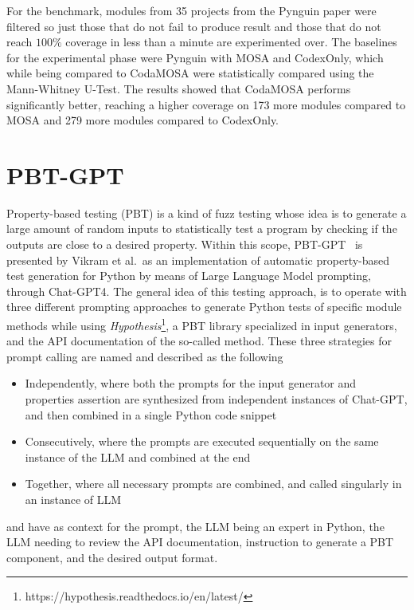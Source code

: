 \documentclass[%
  chapterprefix=false,%
  open=right,%
  twoside=true,%
  paper=a4,%
  logofile={Figures/logo.png},%
  thesistype=master,%
  UKenglish,%
]{se2thesis}
\begin{document}
For the benchmark, modules from 35 projects from the Pynguin paper were filtered so just those that do not fail to produce result and those that do not reach \(100\%\) coverage in less than a minute are experimented over.
The baselines for the experimental phase were Pynguin with MOSA and CodexOnly, which while being compared to CodaMOSA were statistically compared using the Mann-Whitney U-Test.
The results showed that CodaMOSA performs significantly better, reaching a higher coverage on 173 more modules compared to MOSA and 279 more modules compared to CodexOnly.

\section{PBT-GPT}

Property-based testing (PBT) is a kind of fuzz testing whose idea is to generate a large amount of random inputs to statistically test a program by checking if the outputs are close to a desired property.
Within this scope, PBT-GPT~\cite{DBLP:journals/corr/abs-2307-04346} is presented by Vikram et al.\ as an implementation of automatic property-based test generation for Python by means of Large Language Model prompting, through Chat-GPT4.
The general idea of this testing approach, is to operate with three different prompting approaches to generate Python tests of specific module methods while using \textit{Hypothesis}\footnote{https://hypothesis.readthedocs.io/en/latest/}, a PBT library specialized in input generators, and the API documentation of the so-called method.
These three strategies for prompt calling are named and described as the following

\begin{itemize}
  \item Independently, where both the prompts for the input generator and properties assertion are synthesized from independent instances of Chat-GPT, and then combined in a single Python code snippet
  \item Consecutively, where the prompts are executed sequentially on the same instance of the LLM and combined at the end
  \item Together, where all necessary prompts are combined, and called singularly in an instance of LLM
\end{itemize}

and have as context for the prompt, the LLM being an expert in Python, the LLM needing to review the API documentation, instruction to generate a PBT component, and the desired output format.
\end{document}
